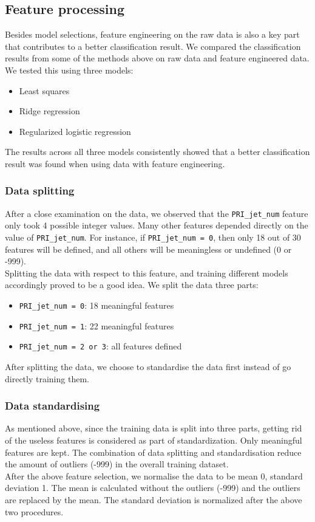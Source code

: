 \documentclass[10pt,conference,compsocconf]{IEEEtran}
\newcommand{\code}[1]{\texttt{#1}} %
\begin{document}
\subsection{Feature processing}

Besides model selections, feature engineering on the raw data is also a key part that contributes to a better classification result. We compared the classification results from some of the methods above on raw data and feature engineered data. We tested this using three models:
\begin{itemize}
\item
 Least squares
\item
Ridge regression
\item
Regularized logistic regression
\end{itemize}
The results across all three models consistently showed that a better classification result was found when using data with feature engineering. \\

\subsubsection{Data splitting}
After a close examination on the data, we observed that the \code{PRI\_jet\_num} feature only took 4 possible integer values.  Many other features depended directly on the value of \code{PRI\_jet\_num}. For instance, if \code{PRI\_jet\_num = 0}, then only 18 out of 30 features will be defined, and all others will be meaningless or undefined (0 or -999). \\
Splitting the data with respect to this feature, and training different models accordingly proved to be a good idea. We split the data three parts:
\begin{itemize}
\item \code{PRI\_jet\_num = 0}: 18 meaningful features
\item \code{PRI\_jet\_num = 1}: 22 meaningful features
\item \code{PRI\_jet\_num = 2 or 3}: all features defined
\end{itemize}
After splitting the data, we choose to standardise the data first instead of go directly training them. \\

\subsubsection{Data standardising}
As mentioned above, since the training data is split into three parts, getting rid of the useless features is considered as part of standardization. Only meaningful features are kept. The combination of data splitting and standardisation reduce the amount of outliers (-999) in the overall training dataset. \\
After the above feature selection, we normalise the data to be mean 0, standard deviation 1. The mean is calculated without the outliers (-999) and the outliers are replaced by the mean. The standard deviation is normalized after the above two procedures.
\end{document}
